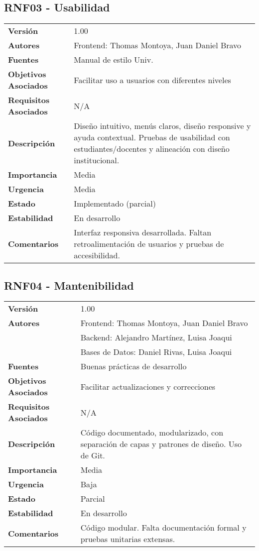 \documentclass{article}
\begin{document}
\subsection*{RNF03 - Usabilidad}
\begin{longtable}{>{\bfseries}l p{}}
Versión & 1.00 \\
Autores & Frontend: Thomas Montoya, Juan Daniel Bravo \\
Fuentes & Manual de estilo Univ. \\
Objetivos Asociados & Facilitar uso a usuarios con diferentes niveles \\
Requisitos Asociados & N/A \\
Descripción & Diseño intuitivo, menús claros, diseño responsive y ayuda contextual. Pruebas de usabilidad con estudiantes/docentes y alineación con diseño institucional. \\
Importancia & Media \\
Urgencia & Media \\
Estado & Implementado (parcial) \\
Estabilidad & En desarrollo \\
Comentarios & Interfaz responsiva desarrollada. Faltan retroalimentación de usuarios y pruebas de accesibilidad. \\
\end{longtable}

\subsection*{RNF04 - Mantenibilidad}
\begin{longtable}{>{\bfseries}l p{}}
Versión & 1.00 \\
Autores & Frontend: Thomas Montoya, Juan Daniel Bravo \\
        & Backend: Alejandro Martínez, Luisa Joaqui \\
        & Bases de Datos: Daniel Rivas, Luisa Joaqui \\
Fuentes & Buenas prácticas de desarrollo \\
Objetivos Asociados & Facilitar actualizaciones y correcciones \\
Requisitos Asociados & N/A \\
Descripción & Código documentado, modularizado, con separación de capas y patrones de diseño. Uso de Git. \\
Importancia & Media \\
Urgencia & Baja \\
Estado & Parcial \\
Estabilidad & En desarrollo \\
Comentarios & Código modular. Falta documentación formal y pruebas unitarias extensas. \\
\end{longtable}
\end{document}
